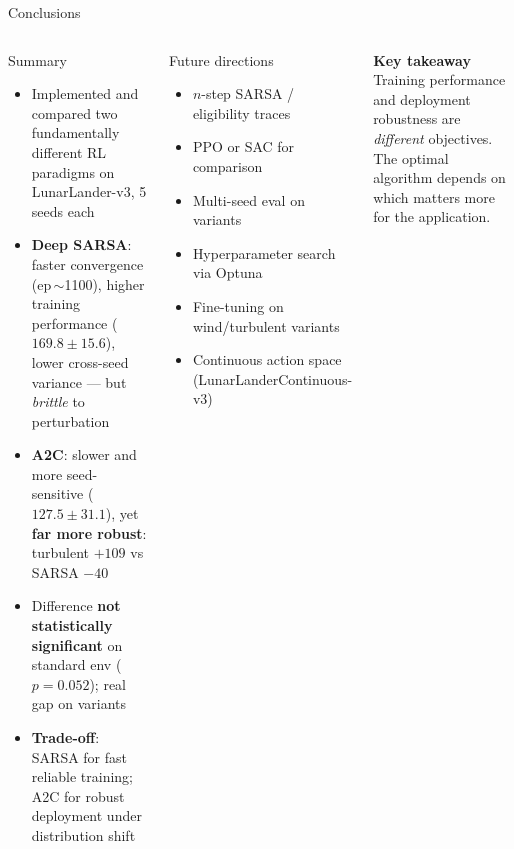\documentclass[aspectratio=169, 10pt]{beamer}
\newcommand{\highlight}[1]{{\color{gold}\textbf{#1}}}
\begin{document}
\begin{frame}{Conclusions}
  \begin{columns}[T]
      \begin{block}{Summary}
        \begin{itemize}
          \item Implemented and compared two fundamentally different
                RL paradigms on LunarLander-v3, 5 seeds each
          \item \textbf{Deep SARSA}: faster convergence (ep\,$\sim$1100),
                higher training performance ($169.8 \pm 15.6$),
                lower cross-seed variance --- but \emph{brittle} to
                perturbation
          \item \textbf{A2C}: slower and more seed-sensitive
                ($127.5 \pm 31.1$), yet \textbf{far more robust}:
                turbulent $+109$ vs SARSA $-40$
          \item Difference \textbf{not statistically significant} on
                standard env ($p = 0.052$); real gap on variants
          \item \textbf{Trade-off}: SARSA for fast reliable training;
                A2C for robust deployment under distribution shift
        \end{itemize}
      \end{block}
      \begin{block}{Future directions}
        \begin{itemize}
          \item $n$-step SARSA / eligibility traces
          \item PPO or SAC for comparison
          \item Multi-seed eval on variants
          \item Hyperparameter search via Optuna
          \item Fine-tuning on wind/turbulent variants
          \item Continuous action space
                (LunarLanderContinuous-v3)
        \end{itemize}
      \end{block}
      \vspace{0.6em}
      \begin{center}
        \highlight{Key takeaway}\\[0.3em]
        \small Training performance and deployment
        robustness are \emph{different} objectives.
        The optimal algorithm depends on which
        matters more for the application.
      \end{center}
  \end{columns}
\end{frame}
\end{document}
